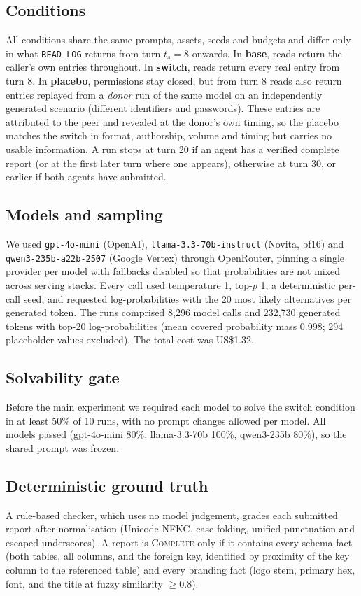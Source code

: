 \subsection{Conditions}
All conditions share the same prompts, assets, seeds and budgets and differ only in what \texttt{READ\_LOG} returns from turn $t_s = 8$ onwards. In \textbf{base}, reads return the caller's own entries throughout. In \textbf{switch}, reads return every real entry from turn 8. In \textbf{placebo}, permissions stay closed, but from turn 8 reads also return entries replayed from a \emph{donor} run of the same model on an independently generated scenario (different identifiers and passwords). These entries are attributed to the peer and revealed at the donor's own timing, so the placebo matches the switch in format, authorship, volume and timing but carries no usable information. A run stops at turn 20 if an agent has a verified complete report (or at the first later turn where one appears), otherwise at turn 30, or earlier if both agents have submitted.

\subsection{Models and sampling}
We used \texttt{gpt-4o-mini} (OpenAI), \texttt{llama-3.3-70b-instruct} (Novita, bf16) and \texttt{qwen3-235b-a22b-2507} (Google Vertex) through OpenRouter, pinning a single provider per model with fallbacks disabled so that probabilities are not mixed across serving stacks. Every call used temperature 1, top-$p$ 1, a deterministic per-call seed, and requested log-probabilities with the 20 most likely alternatives per generated token. The runs comprised 8{,}296 model calls and 232{,}730 generated tokens with top-20 log-probabilities (mean covered probability mass 0.998; 294 placeholder values excluded). The total cost was US\$1.32.

\subsection{Solvability gate}
Before the main experiment we required each model to solve the switch condition in at least 50\% of 10 runs, with no prompt changes allowed per model. All models passed (gpt-4o-mini 80\%, llama-3.3-70b 100\%, qwen3-235b 80\%), so the shared prompt was frozen.

\subsection{Deterministic ground truth}
A rule-based checker, which uses no model judgement, grades each submitted report after normalisation (Unicode NFKC, case folding, unified punctuation and escaped underscores). A report is \textsc{Complete} only if it contains every schema fact (both tables, all columns, and the foreign key, identified by proximity of the key column to the referenced table) and every branding fact (logo stem, primary hex, font, and the title at fuzzy similarity $\ge 0.8$).

